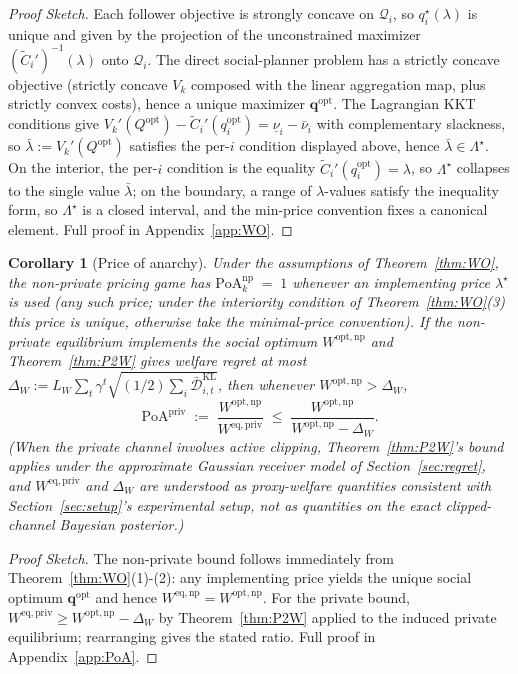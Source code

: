 \documentclass{article}
\newtheorem{corollary}{Corollary}
\begin{document}
\begin{proof}
    [Proof Sketch]
    Each follower objective is strongly concave on $\mathcal Q_i$, so $q_i^\star(\lambda)$ is unique and given by the projection of the unconstrained maximizer $(\widetilde C_i')^{-1}(\lambda)$ onto $\mathcal Q_i$. The direct social-planner problem has a strictly concave objective (strictly concave $V_k$ composed with the linear aggregation map, plus strictly convex costs), hence a unique maximizer $\mathbf q^{\mathrm{opt}}$. The Lagrangian KKT conditions give $V_k'(Q^{\mathrm{opt}}) - \widetilde C_i'(q_i^{\mathrm{opt}}) = \underline\nu_i - \bar\nu_i$ with complementary slackness, so $\bar\lambda := V_k'(Q^{\mathrm{opt}})$ satisfies the per-$i$ condition displayed above, hence $\bar\lambda \in \Lambda^\star$. On the interior, the per-$i$ condition is the equality $\widetilde C_i'(q_i^{\mathrm{opt}}) = \lambda$, so $\Lambda^\star$ collapses to the single value $\bar\lambda$; on the boundary, a range of $\lambda$-values satisfy the inequality form, so $\Lambda^\star$ is a closed interval, and the min-price convention fixes a canonical element. Full proof in Appendix~\ref{app:WO}.
\end{proof}

\begin{corollary}[Price of anarchy]
\label{cor:PoA}
    Under the assumptions of Theorem~\ref{thm:WO}, the non-private pricing game has $\mathrm{PoA}_k^{\mathrm{np}} \;=\; 1$ whenever an implementing price $\lambda^\star$ is used (any such price; under the interiority condition of Theorem~\ref{thm:WO}(3) this price is unique, otherwise take the minimal-price convention).
    If the non-private equilibrium implements the social optimum $W^{\mathrm{opt,np}}$ and Theorem~\ref{thm:P2W} gives welfare regret at most $\Delta_W := L_W \sum_t \gamma^t \sqrt{(1/2) \sum_i \bar{\mathcal{D}}_{i,t}^{\mathrm{KL}}}$, then whenever $W^{\mathrm{opt,np}} > \Delta_W$,
    $$\mathrm{PoA}^{\mathrm{priv}} \;:=\; \frac{W^{\mathrm{opt,np}}}{W^{\mathrm{eq,priv}}} \;\le\; \frac{W^{\mathrm{opt,np}}}{W^{\mathrm{opt,np}} - \Delta_W}.$$
    (When the private channel involves active clipping, Theorem~\ref{thm:P2W}'s bound applies under the approximate Gaussian receiver model of Section~\ref{sec:regret}, and $W^{\mathrm{eq,priv}}$ and $\Delta_W$ are understood as proxy-welfare quantities consistent with Section~\ref{sec:setup}'s experimental setup, not as quantities on the exact clipped-channel Bayesian posterior.)
\end{corollary}
\begin{proof}[Proof Sketch]
    The non-private bound follows immediately from Theorem~\ref{thm:WO}(1)-(2): any implementing price yields the unique social optimum $\mathbf q^{\mathrm{opt}}$ and hence $W^{\mathrm{eq,np}} = W^{\mathrm{opt,np}}$. For the private bound, $W^{\mathrm{eq,priv}} \ge W^{\mathrm{opt,np}} - \Delta_W$ by Theorem~\ref{thm:P2W} applied to the induced private equilibrium; rearranging gives the stated ratio. Full proof in Appendix~\ref{app:PoA}.
\end{proof}
\end{document}
